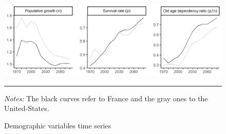 \begin{figure}[tb]
	\centering
	\includegraphics[width=\linewidth]{../result/demo_npdep.png} 
	\caption{Demographic variables time series}\label{fig:demo}
	\vspace{.5ex}
	\hrule
	\vspace{-4ex}
	\justify\singlespacing\footnotesize \textit{Notes:} The black curves refer to France and the gray ones to the United-States.
\end{figure}

